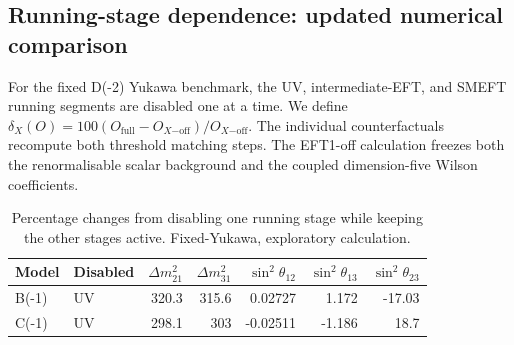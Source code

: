 \subsection*{Running-stage dependence: updated numerical comparison}
For the fixed D(-2) Yukawa benchmark, the
UV, intermediate-EFT, and SMEFT running segments are disabled one at a time.
We define $\delta_X(O)=100(O_{\mathrm{full}}-O_{X\mathrm{-off}})/O_{X\mathrm{-off}}$.
The individual counterfactuals recompute both threshold matching steps.
The EFT1-off calculation freezes both the renormalisable scalar background and
the coupled dimension-five Wilson coefficients.
\begin{table}[htbp]
\centering
\scriptsize
\begin{tabular}{llrrrrr}
\hline
Model & Disabled & $\Delta m^2_{21}$ & $\Delta m^2_{31}$ & $\sin^2\theta_{12}$ & $\sin^2\theta_{13}$ & $\sin^2\theta_{23}$ \\
\hline
B(-1) & UV & 320.3 & 315.6 & 0.02727 & 1.172 & -17.03 \\
C(-1) & UV & 298.1 & 303 & -0.02511 & -1.186 & 18.7 \\
\hline
\end{tabular}
\caption{Percentage changes from disabling one running stage while keeping the other stages active. Fixed-Yukawa, exploratory calculation.}
\label{tab:generalised_running_d-2}
\end{table}
